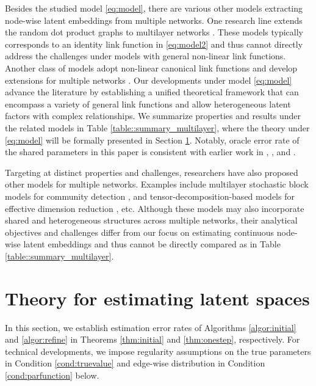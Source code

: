 \documentclass[12pt]{article}
\begin{document}
Besides the studied model  \eqref{eq:model}, there are various other models extracting node-wise latent embeddings from multiple networks. 
One research line extends the random dot product graphs \citep{young2007random,athreya2018survey} to multilayer networks \citep{arroyo2021inference,zheng2022limit}. 
These models typically corresponds to an identity link function in \eqref{eq:model2} and thus cannot directly address the challenges under models with general non-linear link functions. 
Another class of models adopt non-linear canonical link functions   
\citep{hoff2002latent,ma2020universal} and develop extensions for multiple networks \citep{zhang2020flexible,macdonald2022latent,he2023semiparametric}. 
Our developments under 
model  \eqref{eq:model} 
advance the  literature by  establishing a unified theoretical framework that can encompass a variety of general link functions and allow heterogeneous latent factors with complex relationships.  
We summarize properties and results under the related models in  Table \ref{table::summary_multilayer},
where the theory under \eqref{eq:model} will be formally presented in Section \ref{sec:theory}. 
Notably, oracle error rate  of the shared parameters in this paper is consistent with earlier work in \cite{arroyo2021inference}, \cite{macdonald2022latent}, and  \cite{he2023semiparametric}.





Targeting at distinct properties and challenges, researchers have also proposed other models for multiple networks. 
Examples include 
multilayer stochastic block models  for community detection \citep{han2015consistent, paul2016consistent, lei2019consistent}, and tensor-decomposition-based models for effective dimension reduction \citep{lyu2023latent,zhangefficient}, etc. 
Although these models may also incorporate shared and heterogeneous structures across multiple networks, 
their analytical objectives and challenges differ from our focus on estimating continuous node-wise latent embeddings and thus cannot be directly compared as in Table \ref{table::summary_multilayer}. 










\section{Theory for estimating latent spaces} \label{sec:theory} 
In this section, we establish estimation error rates of  Algorithms \ref{algor:initial} and \ref{algor:refine} in Theorems \ref{thm:initial} and \ref{thm:onestep}, respectively.  
For technical developments, 
we impose regularity 
assumptions on the true parameters in Condition \ref{cond:truevalue} and edge-wise distribution  in Condition \ref{cond:parfunction} below. 
\end{document}
